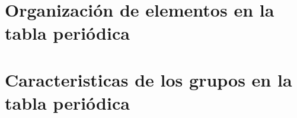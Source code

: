 


\section{Organización de elementos en la tabla periódica}



\section{Caracteristicas de los grupos en la tabla periódica}


